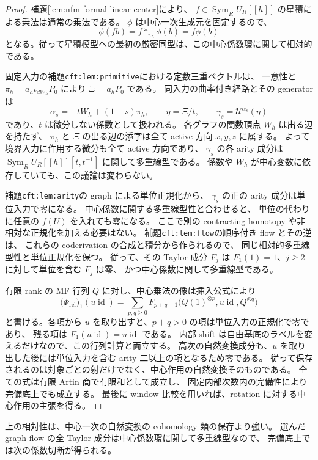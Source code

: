 \begin{proof}
補題\ref{lem:nfm-formal-linear-center}により、
$f\in\operatorname{Sym}_R U_R[[h]]$ の星積による乗法は通常の乗法である。
$\phi$ は中心一次生成元を固定するので、
\[
 \phi(fb)=f*_{\pi_h}\phi(b)=f\phi(b)
\]
となる。従って星積模型への最初の厳密同型は、この中心係数環に関して相対的である。

固定入力の補題\texttt{cft:lem:primitive}における定数三重ベクトルは、
一意性と $\pi_h=a_h\iota_{dW_h}P_0$ により $\Xi=a_hP_0$ である。
同入力の曲率付き経路とその generator は
\[
 \alpha_s=-tW_h+(1-s)\pi_h,\qquad
 \eta=\Xi/t,\qquad
 \gamma_s=\mathcal U^{\alpha_s}(\eta)
\]
であり、$t$ は微分しない係数として扱われる。
各グラフの関数頂点 $W_h$ は出る辺を持たず、
$\pi_h$ と $\Xi$ の出る辺の添字は全て active 方向 $x,y,z$ に属する。
よって境界入力に作用する微分も全て active 方向であり、
$\gamma_s$ の各 arity 成分は
$\operatorname{Sym}_R U_R[[h]][t,t^{-1}]$ に関して多重線型である。
係数や $W_h$ が中心変数に依存していても、この議論は変わらない。

補題\texttt{cft:lem:arity}の graph による単位正規化から、
$\gamma_s$ の正の arity 成分は単位入力で零になる。
中心係数に関する多重線型性と合わせると、
単位の代わりに任意の $f(U)$ を入れても零になる。
ここで別の contracting homotopy や非相対な正規化を加える必要はない。
補題\texttt{cft:lem:flow}の順序付き flow とその逆は、
これらの coderivation の合成と積分から作られるので、
同じ相対的多重線型性と単位正規化を保つ。
従って、その Taylor 成分 $F_j$ は
$F_1(1)=1$、$j\ge2$ に対して単位を含む $F_j$ は零、
かつ中心係数に関して多重線型である。

有限 rank の MF 行列 $Q$ に対し、中心乗法の像は挿入公式により
\[
 \bigl(\Phi_{\mathrm{rel}}\bigr)_1(u\operatorname{id})
 =\sum_{p,q\ge0}
 F_{p+q+1}\bigl(Q(1)^{\otimes p},
                 u\operatorname{id},Q^{\otimes q}\bigr)
\]
と書ける。各項から $u$ を取り出すと、$p+q>0$ の項は単位入力の正規化で零であり、
残る項は $F_1(u\operatorname{id})=u\operatorname{id}$ である。
内部 shift は自由基底のラベルを変えるだけなので、この行列計算と両立する。
高次の自然変換成分も、$u$ を取り出した後には単位入力を含む
arity 二以上の項となるため零である。
従って保存されるのは対象ごとの射だけでなく、中心作用の自然変換そのものである。
全ての式は有限 Artin 商で有限和として成立し、
固定内部次数内の完備性により完備底上でも成立する。
最後に window 比較を用いれば、rotation に対する中心作用の主張を得る。
\end{proof}

上の相対性は、中心一次の自然変換の cohomology 類の保存より強い。
選んだ graph flow の全 Taylor 成分は中心係数環に関して多重線型なので、
完備底上では次の係数切断が得られる。

